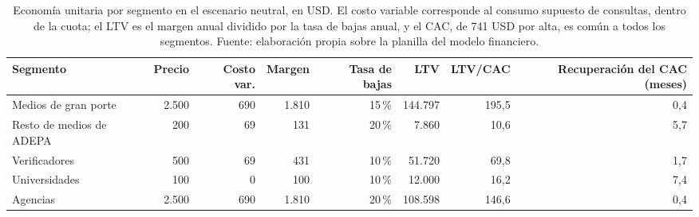\begin{table}[t]
  \centering
  \footnotesize\setlength{\tabcolsep}{3.5pt}
  \caption{Economía unitaria por segmento en el escenario neutral, en USD. El costo variable corresponde al consumo supuesto de consultas, dentro de la cuota; el LTV es el margen anual dividido por la tasa de bajas anual, y el CAC, de 741 USD por alta, es común a todos los segmentos. Fuente: elaboración propia sobre la planilla del modelo financiero.}
  \label{tab:financiero-unitaria}
  \begin{tabular}{l r r r r r r r}
    \hline
    \textbf{Segmento} & \textbf{Precio} & \textbf{Costo var.} & \textbf{Margen} & \textbf{Tasa de bajas} & \textbf{LTV} & \textbf{LTV/CAC} & \textbf{Recuperación del CAC (meses)} \\
    \hline
    Medios de gran porte & 2.500 & 690 & 1.810 & 15\,\% & 144.797 & 195,5 & 0,4 \\
    Resto de medios de ADEPA & 200 & 69 & 131 & 20\,\% & 7.860 & 10,6 & 5,7 \\
    Verificadores & 500 & 69 & 431 & 10\,\% & 51.720 & 69,8 & 1,7 \\
    Universidades & 100 & 0 & 100 & 10\,\% & 12.000 & 16,2 & 7,4 \\
    Agencias & 2.500 & 690 & 1.810 & 20\,\% & 108.598 & 146,6 & 0,4 \\
    \hline
  \end{tabular}
\end{table}
